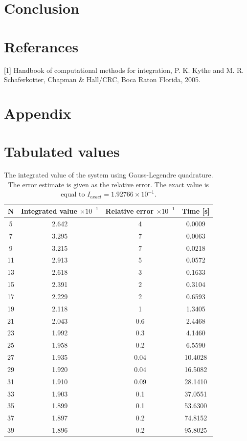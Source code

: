 \documentclass[%
reprint,
amsmath,amssymb,
aps,
]{revtex4-1}
\begin{document}
\section{Conclusion }

\newpage 
\onecolumngrid
\section{Referances}
[1] Handbook of computational methods for integration, P. K. Kythe and M. R. Schaferkotter, Chapman \& Hall/CRC, Boca Raton Florida, 2005.

\section{Appendix}
\section{Tabulated values}

\begin{table}[!h]
	\begin{tabular}{|c|c|c|c|}
		\hline 
		\hspace{5mm} \textbf{N} \hspace{5mm} & \textbf{Integrated value $\times 10^{-1}$} & \hspace{3mm}\textbf{Relative error $\times 10^{-1}$} & \hspace{3mm}\textbf{Time  [s]} \hspace{5mm}\\
		\hline 
			5 & 2.642  & 4  & 0.0009 \\
			7 & 3.295  & 7  & 0.0063 \\
			9 & 3.215  & 7  & 0.0218 \\
			11 & 2.913  & 5  & 0.0572 \\
			13 & 2.618  & 3  & 0.1633 \\
			15 & 2.391  & 2  & 0.3104 \\
			17 & 2.229  & 2  & 0.6593 \\
			19 & 2.118  & 1  & 1.3405 \\
			21 & 2.043  & 0.6  & 2.4468 \\
			23 & 1.992  & 0.3  & 4.1460 \\
			25 & 1.958  & 0.2  & 6.5590 \\
			27 & 1.935  & 0.04  & 10.4028 \\
			29 & 1.920  & 0.04  & 16.5082 \\
			31 & 1.910  & 0.09  & 28.1410 \\
			33 & 1.903  & 0.1  & 37.0551 \\
			35 & 1.899  & 0.1  & 53.6300 \\
			37 & 1.897  & 0.2  & 74.8152 \\
			39 & 1.896  & 0.2  & 95.8025 \\

		\hline 
	\end{tabular}
	\caption{\label{legendre_values} \centering The integrated value of the system using Gauss-Legendre quadrature. The error estimate is given as the relative error. The exact value is equal to $I_{exact} = 1.92766 \times 10^{-1}$.}
\end{table}
\end{document}
